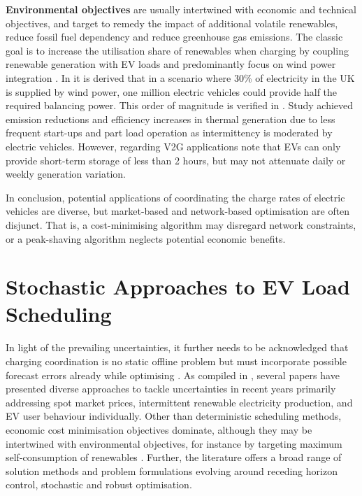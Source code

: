 \textbf{Environmental objectives} are usually intertwined with economic and technical objectives, and target to remedy the impact of additional volatile renewables, reduce fossil fuel dependency and reduce greenhouse gas emissions. The classic goal is to increase the utilisation share of renewables when charging by coupling renewable generation with EV loads \cite{Richardson2013, Vandael2011} and predominantly focus on wind power integration \cite{Pehnt2011, Short2006, Denholm2006}. In \cite{Druitt2012} it is derived that in a scenario where 30\% of electricity in the UK is supplied by wind power, one million electric vehicles could provide half the required balancing power. This order of magnitude is verified in \cite{Ekman2011}. Study \cite{Goransson2010} achieved emission reductions and efficiency increases in thermal generation due to less frequent start-ups and part load operation as intermittency is moderated by electric vehicles. However, regarding V2G applications \cite{Kempton2005, Kempton2006} note that EVs can only provide short-term storage of less than 2 hours, but may not attenuate daily or weekly generation variation.

In conclusion, potential applications of coordinating the charge rates of electric vehicles are diverse, but market-based and network-based optimisation are often disjunct. That is, a cost-minimising algorithm may disregard network constraints, or a peak-shaving algorithm neglects potential economic benefits. 

\newpage
\section{Stochastic Approaches to EV Load Scheduling}
\label{sec:stochlr}

In light of the prevailing uncertainties, it further needs to be acknowledged that charging coordination is no static offline problem but must incorporate possible forecast errors already while optimising \cite{Aghaei2016}. As compiled in , several papers have presented diverse approaches to tackle uncertainties in recent years primarily addressing spot market prices, intermittent renewable electricity production, and EV user behaviour individually. Other than deterministic scheduling methods, economic cost minimisation objectives dominate, although they may be intertwined with environmental objectives, for instance by targeting maximum self-consumption of renewables \cite{Mehri2017, Jin2014, Bai2015}. Further, the literature offers a broad range of solution methods and problem formulations evolving around receding horizon control, stochastic and robust optimisation. 


